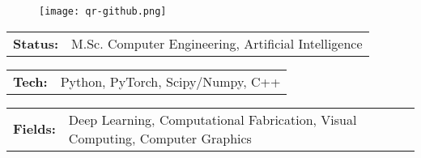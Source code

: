\documentclass[10pt,A4]{article}
\newcommand{\tzlarrow}{(0,0) -- (0.2,0) -- (0.3,0.2) -- (0.2,0.4) -- (0,0.4) -- (0.1,0.2) -- cycle;}
\newcommand{\larrow}[1]
{\begin{tikzpicture}[scale=0.58]
	 \filldraw[fill=#1!100,draw=#1!100!black]  \tzlarrow
 \end{tikzpicture}
}
\newcommand{\metasection}[2]
{
\begin{tabular*}{1\textwidth}{p{2.0cm} p{10cm}}
\larrow{sectcol}	\normalsize{\textbf{#1}}&#2\\[12pt]
\end{tabular*}
}
\begin{document}
\pagestyle{fancy}	


\vspace{-20.55pt}


\hspace{-0.25\linewidth}\colorbox{bgcol}{}



\begin{figure}[H]
\begin{flushright}
	\texttt{[image: qr-github.png]}
\end{flushright}
\end{figure}



\vspace{-114pt}

\metasection{Status:}{M.Sc. Computer Engineering, Artificial Intelligence}
\metasection{Tech:}{Python, PyTorch, Scipy/Numpy, C++}
\metasection{Fields:}{Deep Learning, Computational Fabrication, Visual Computing, Computer Graphics}
\end{document}
